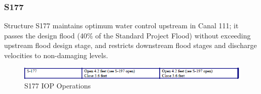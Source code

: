 

\clearpage

\subsubsection{S177}

Structure S177 maintains optimum water control upstream in Canal 111; it passes the design flood (40\% of the Standard Project Flood) without exceeding upstream flood design stage, and restricts downstream flood stages and discharge velocities to non-damaging levels.

\begin{figure}[!h]
  \begin{center}
  \includegraphics[width=6.5in]{../figs/S177_IOPops.png}
  \caption{S177 IOP Operations}
  \label{fig:S177iop}
  \end{center}
\end{figure}


